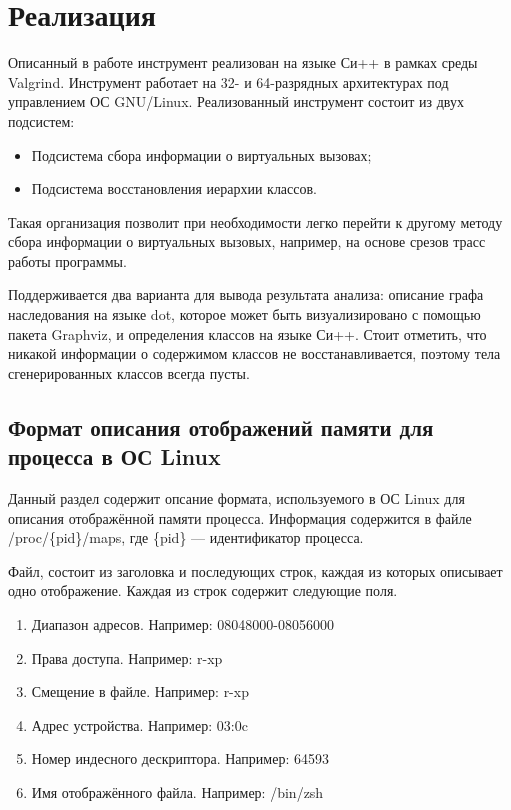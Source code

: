 \documentclass[a4paper,12pt,russian]{article}
\newcommand{\code}[1]{\textsf{#1}}
\begin{document}
\newpage
\section{Реализация}
Описанный в работе инструмент реализован на языке Си++ в рамках среды \code{Valgrind}. Инструмент работает на 32- и 64-разрядных архитектурах под управлением ОС \code{GNU/Linux}.
Реализованный инструмент состоит из двух подсистем:
\begin{itemize}
    \item Подсистема сбора информации о виртуальных вызовах;
    \item Подсистема восстановления иерархии классов.
\end{itemize}
Такая организация позволит при необходимости легко перейти к другому методу сбора информации о виртуальных вызовых, например, на основе срезов трасс работы программы.

Поддерживается два варианта для вывода результата анализа: описание графа наследования на языке \code{dot}, которое может быть визуализировано с помощью пакета \code{Graphviz}, и определения классов на языке Си++.
Стоит отметить, что никакой информации о содержимом классов не восстанавливается, поэтому тела сгенерированных классов всегда пусты.

\subsection{Формат описания отображений памяти для процесса в ОС \code{Linux}}
Данный раздел содержит опсание формата, используемого в ОС \code{Linux} для описания отображённой памяти процесса.
Информация содержится в файле \code{/proc/\{pid\}/maps}, где \code{\{pid\}} --- идентификатор процесса.

Файл, состоит из заголовка и последующих строк, каждая из которых описывает одно отображение. Каждая из строк содержит следующие поля.

\begin{enumerate}
    \item Диапазон адресов. Например: \code{08048000-08056000}
    \item Права доступа. Например: \code{r-xp}
    \item Смещение в файле. Например: \code{r-xp}
    \item Адрес устройства. Например: \code{03:0c}
    \item Номер индесного дескриптора. Например: \code{64593}
    \item Имя отображённого файла. Например: \code{/bin/zsh}
\end{enumerate}
\end{document}
